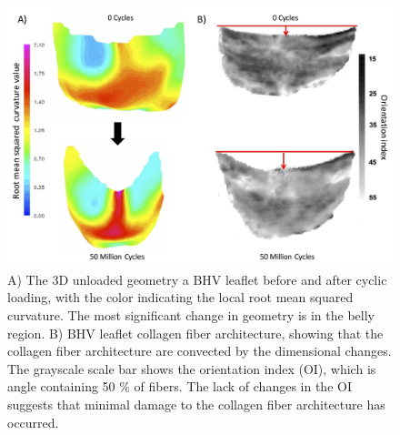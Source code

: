 \begin{figure}[hbt]
\centering
\includegraphics[width=\textwidth]{Images/chapter4/figure1}
\caption{A) The 3D unloaded geometry a BHV leaflet before and after cyclic loading, with the color indicating the local root mean squared curvature. The most significant change in geometry is in the belly region. B) BHV leaflet collagen fiber architecture, showing that the collagen fiber architecture are convected by the dimensional changes. The grayscale scale bar shows the orientation index (OI), which is angle containing 50 \% of fibers. The lack of changes in the OI suggests that minimal damage to the collagen fiber architecture has occurred.}
\label{c1:fig:PSeffects}
\end{figure}



